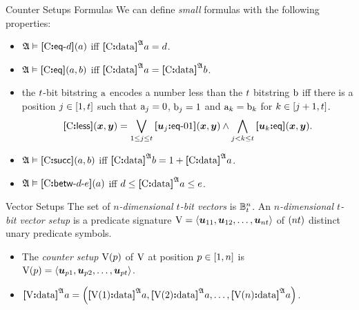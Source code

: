 \documentclass{beamer}
\begin{document}
\begin{frame}{Counter Setups Formulas}
We can define \emph{small} formulas with the following properties:
\begin{itemize}
  \item
  $\StrA\vDash\feqA\CS\datad(\ea)$ iff $\data\CS\StrA\ea = \datad$.
  
  \item
  $\StrA\vDash\feq\CS(\ea,\eb)$ iff $\data\CS\StrA\ea = \data\CS\StrA\eb$.
  
  \item
  the $\tbit$-bit bitstring $\bstra$ encodes a number less than the
  $\tbit$ bitstring $\bstrb$ iff there is a position $\jj\in[1,\tbit]$ such that
  $\bstra_j = 0$, $\bstrb_j = 1$ and $\bstra_k = \bstrb_k$ for
  $k\in[j+1,\tbit]$.
  \[
    \fless\CS(\xx,\yy) = \bigvee_{1 \leq \jj \leq \tbit} \feqOI{\suu\jj}(\xx,\yy)
    \land \bigwedge_{\jj < \kk \leq \tbit} \feq{\suu\kk}(\xx,\yy).
  \]
  
  \item
  $\StrA\vDash\fsucc\CS(\ea,\eb)$ iff $\data\CS\StrA\eb = 1 +
  \data\CS\StrA\ea$.
  
  \item
  $\StrA \vDash \fbetw\CS\datad\datae(\ea)$ iff
  $\datad \leq \data\CS\StrA\ea \leq \datae$.
\end{itemize}
\end{frame}

\begin{frame}{Vector Setups}
The set of \emph{$n$-dimensional $t$-bit vectors} is $\ntBitnums\nn\tbit$.
An \emph{$n$-dimensional $t$-bit vector setup} is a predicate signature  $\VS =
\seq{\suu{11}, \suu{12}, \dots, \suu{\nn\tbit}}$ of $(\nn\tbit)$ distinct unary
predicate symbols.
\begin{itemize}
  \item
  The \emph{counter setup $\VSp\posp$} of $\VS$ at position $\posp \in [1,\nn]$
  is $\VSp\posp = \seq{\suu{\posp1},\suu{\posp2},\dots,\suu{\posp\tbit}}$.
  
  \item
  $\data\VS\StrA\ea = \left(\data{\VSp1}\StrA\ea,\data{\VSp2}\StrA\ea, \dots,
  \data{\VSp\nn}\StrA\ea\right)$.
\end{itemize}
\end{frame}
\end{document}
